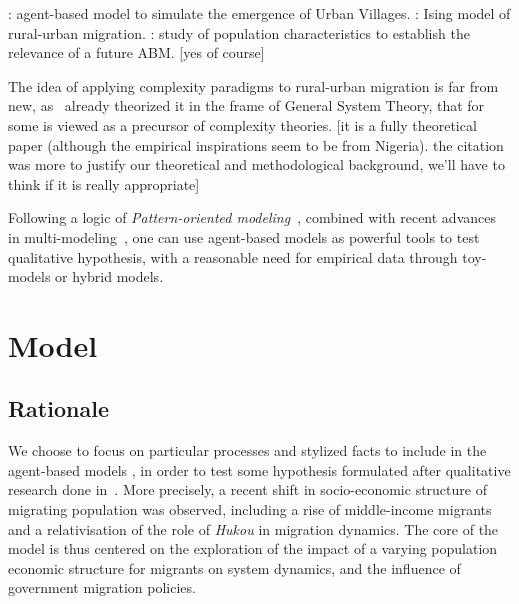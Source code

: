 \cite{xie2007simulating} : agent-based model to simulate the emergence of Urban Villages. \cite{silveira2006agent} : Ising model of rural-urban migration. \cite{fernandez2005characterizing} : study of population characteristics to establish the relevance of a future ABM. [yes of course]

The idea of applying complexity paradigms to rural-urban migration is far from new, as~\cite{mabogunje1970systems} already theorized it in the frame of General System Theory, that for some is viewed as a precursor of complexity theories. [it is a fully theoretical paper (although the empirical inspirations seem to be from Nigeria). the citation was more to justify our theoretical and methodological background, we'll have to think if it is really appropriate]

Following a logic of \emph{Pattern-oriented modeling}~\cite{grimm2005pattern}, combined with recent advances in multi-modeling~\cite{cottineau2016back}, one can use agent-based models as powerful tools to test qualitative hypothesis, with a reasonable need for empirical data through toy-models or hybrid models.



\section{Model}

\subsection{Rationale}

We choose to focus on particular processes and stylized facts to include in the agent-based models , in order to test some hypothesis formulated after qualitative research done in~\cite{losavio2016analyser}. More precisely, a recent shift in socio-economic structure of migrating population was observed, including a rise of middle-income migrants and a relativisation of the role of \emph{Hukou} in migration dynamics. The core of the model is thus centered on the exploration of the impact of a varying population economic structure for migrants on system dynamics, and the influence of government migration policies.

